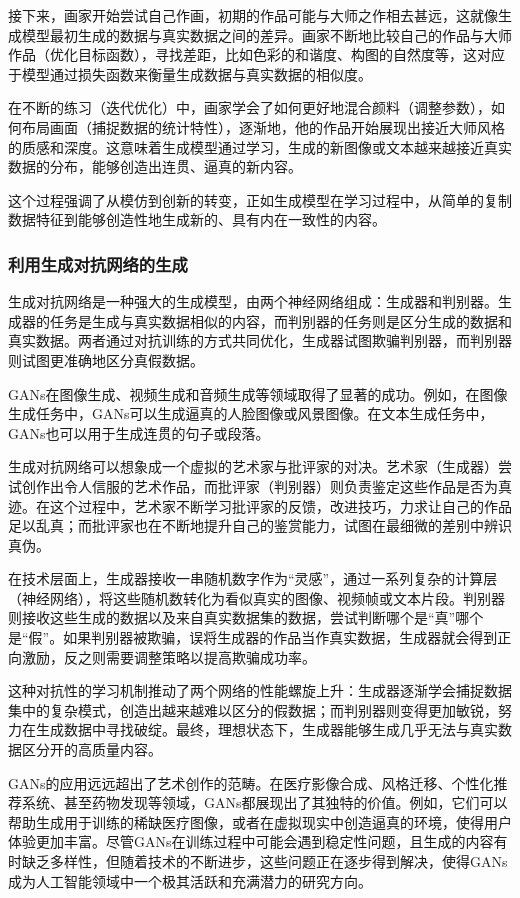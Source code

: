 接下来，画家开始尝试自己作画，初期的作品可能与大师之作相去甚远，这就像生成模型最初生成的数据与真实数据之间的差异。画家不断地比较自己的作品与大师作品（优化目标函数），寻找差距，比如色彩的和谐度、构图的自然度等，这对应于模型通过损失函数来衡量生成数据与真实数据的相似度。

在不断的练习（迭代优化）中，画家学会了如何更好地混合颜料（调整参数），如何布局画面（捕捉数据的统计特性），逐渐地，他的作品开始展现出接近大师风格的质感和深度。这意味着生成模型通过学习，生成的新图像或文本越来越接近真实数据的分布，能够创造出连贯、逼真的新内容。

这个过程强调了从模仿到创新的转变，正如生成模型在学习过程中，从简单的复制数据特征到能够创造性地生成新的、具有内在一致性的内容。



\subsubsection{利用生成对抗网络的生成}

生成对抗网络是一种强大的生成模型，由两个神经网络组成：生成器和判别器。生成器的任务是生成与真实数据相似的内容，而判别器的任务则是区分生成的数据和真实数据。两者通过对抗训练的方式共同优化，生成器试图欺骗判别器，而判别器则试图更准确地区分真假数据。

GANs在图像生成、视频生成和音频生成等领域取得了显著的成功。例如，在图像生成任务中，GANs可以生成逼真的人脸图像或风景图像。在文本生成任务中，GANs也可以用于生成连贯的句子或段落。

生成对抗网络可以想象成一个虚拟的艺术家与批评家的对决。艺术家（生成器）尝试创作出令人信服的艺术作品，而批评家（判别器）则负责鉴定这些作品是否为真迹。在这个过程中，艺术家不断学习批评家的反馈，改进技巧，力求让自己的作品足以乱真；而批评家也在不断地提升自己的鉴赏能力，试图在最细微的差别中辨识真伪。

在技术层面上，生成器接收一串随机数字作为“灵感”，通过一系列复杂的计算层（神经网络），将这些随机数转化为看似真实的图像、视频帧或文本片段。判别器则接收这些生成的数据以及来自真实数据集的数据，尝试判断哪个是“真”哪个是“假”。如果判别器被欺骗，误将生成器的作品当作真实数据，生成器就会得到正向激励，反之则需要调整策略以提高欺骗成功率。

这种对抗性的学习机制推动了两个网络的性能螺旋上升：生成器逐渐学会捕捉数据集中的复杂模式，创造出越来越难以区分的假数据；而判别器则变得更加敏锐，努力在生成数据中寻找破绽。最终，理想状态下，生成器能够生成几乎无法与真实数据区分开的高质量内容。

GANs的应用远远超出了艺术创作的范畴。在医疗影像合成、风格迁移、个性化推荐系统、甚至药物发现等领域，GANs都展现出了其独特的价值。例如，它们可以帮助生成用于训练的稀缺医疗图像，或者在虚拟现实中创造逼真的环境，使得用户体验更加丰富。尽管GANs在训练过程中可能会遇到稳定性问题，且生成的内容有时缺乏多样性，但随着技术的不断进步，这些问题正在逐步得到解决，使得GANs成为人工智能领域中一个极其活跃和充满潜力的研究方向。


